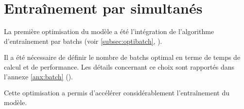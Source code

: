 \section{Entraînement par  simultanés}
La première optimisation du modèle a été l'intégration de l'algorithme d'entraînement par \glspl{batch} (voir \autoref{subsec:optibatch}, ).

Il a été nécessaire de définir le nombre de \glspl{batch} optimal en terme de temps de calcul et de performance. Les détails concernant ce choix sont rapportés dans l'annexe \ref{anx:batch} ().

Cette optimisation a permis d'accélérer considérablement l'entraînement du modèle.